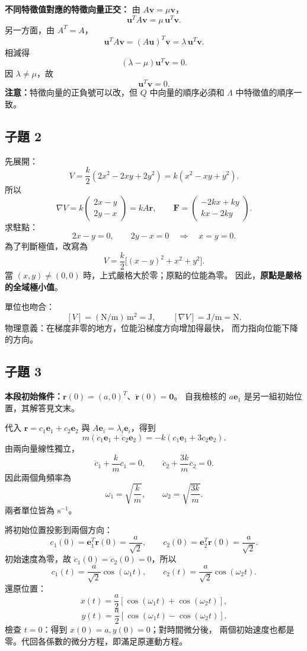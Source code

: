 \documentclass[12pt,a4paper]{article}
\begin{document}
\textbf{不同特徵值對應的特徵向量正交：}
由 \(A\mathbf v=\mu\mathbf v\)，
\[
    \mathbf u^TA\mathbf v=\mu\,\mathbf u^T\mathbf v.
\]
另一方面，由 \(A^T=A\)，
\[
    \mathbf u^TA\mathbf v
    =(A\mathbf u)^T\mathbf v
    =\lambda\,\mathbf u^T\mathbf v.
\]
相減得
\[
    (\lambda-\mu)\mathbf u^T\mathbf v=0.
\]
因 \(\lambda\ne\mu\)，故
\[
    \boxed{\mathbf u^T\mathbf v=0}.
\]
\textbf{注意：}特徵向量的正負號可以改，但 \(Q\) 中向量的順序必須和
\(\Lambda\) 中特徵值的順序一致。

\subsection*{子題 2}
先展開：
\[
    V=\frac{k}{2}(2x^2-2xy+2y^2)=k(x^2-xy+y^2).
\]
所以
\[
    \nabla V=k\begin{pmatrix}2x-y\\2y-x\end{pmatrix}=kA\mathbf r,
    \qquad
    \boxed{\mathbf F=\begin{pmatrix}-2kx+ky\\kx-2ky\end{pmatrix}}.
\]
求駐點：
\[
    2x-y=0,\qquad 2y-x=0
    \quad\Longrightarrow\quad
    \boxed{x=y=0}.
\]
為了判斷極值，改寫為
\[
    V=\frac{k}{2}\big[(x-y)^2+x^2+y^2\big].
\]
當 \((x,y)\ne(0,0)\) 時，上式嚴格大於零；原點的位能為零。
因此，\textbf{原點是嚴格的全域極小值}。

單位也吻合：
\[
    [V]=(\mathrm{N/m})\,\mathrm m^2=\mathrm J,\qquad
    [\nabla V]=\mathrm{J/m}=\mathrm N.
\]
物理意義：在梯度非零的地方，位能沿梯度方向增加得最快，
而力指向位能下降的方向。

\subsection*{子題 3}
\textbf{本段初始條件：}\(\mathbf r(0)=(a,0)^T\)、\(\dot{\mathbf r}(0)=\mathbf0\)。
自我檢核的 \(a\mathbf e_1\) 是另一組初始位置，其解答見文末。

代入 \(\mathbf r=c_1\mathbf e_1+c_2\mathbf e_2\) 與
\(A\mathbf e_i=\lambda_i\mathbf e_i\)，得到
\[
    m(\ddot c_1\mathbf e_1+\ddot c_2\mathbf e_2)
    =-k(c_1\mathbf e_1+3c_2\mathbf e_2).
\]
由兩向量線性獨立，
\[
    \ddot c_1+\frac{k}{m}c_1=0,\qquad
    \ddot c_2+\frac{3k}{m}c_2=0.
\]
因此兩個角頻率為
\[
    \omega_1=\sqrt{\frac{k}{m}},\qquad
    \omega_2=\sqrt{\frac{3k}{m}}.
\]
兩者單位皆為 \(\mathrm{s^{-1}}\)。

將初始位置投影到兩個方向：
\[
    c_1(0)=\mathbf e_1^T\mathbf r(0)=\frac a{\sqrt2},\qquad
    c_2(0)=\mathbf e_2^T\mathbf r(0)=\frac a{\sqrt2}.
\]
初始速度為零，故 \(\dot c_1(0)=\dot c_2(0)=0\)，所以
\[
    c_1(t)=\frac a{\sqrt2}\cos(\omega_1t),\qquad
    c_2(t)=\frac a{\sqrt2}\cos(\omega_2t).
\]
還原位置：
\[
    \boxed{x(t)=\frac a2[\cos(\omega_1t)+\cos(\omega_2t)]},
\]
\[
    \boxed{y(t)=\frac a2[\cos(\omega_1t)-\cos(\omega_2t)]}.
\]
檢查 \(t=0\)：得到 \(x(0)=a,y(0)=0\)；對時間微分後，
兩個初始速度也都是零。代回各係數的微分方程，即滿足原運動方程。
\end{document}
